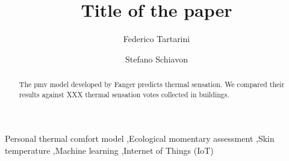 
\begin{frontmatter}

    \title{Title of the paper}

    \author[label1]{Federico Tartarini}
    \author[label2]{Stefano Schiavon}

    \address[label1]{Berkeley Education Alliance for Research in Singapore, Singapore}
    \address[label2]{Center for the Built Environment, University of California, Berkeley, CA, USA}


    \begin{abstract}
        The \ac{pmv} model developed by Fanger predicts thermal sensation.
        We compared their results against XXX thermal sensation votes collected in buildings.
    \end{abstract}

    \begin{keyword}
        Personal thermal comfort model \sep Ecological momentary assessment \sep Skin temperature \sep Machine learning \sep Internet of Things (IoT)
    \end{keyword}

\end{frontmatter}
